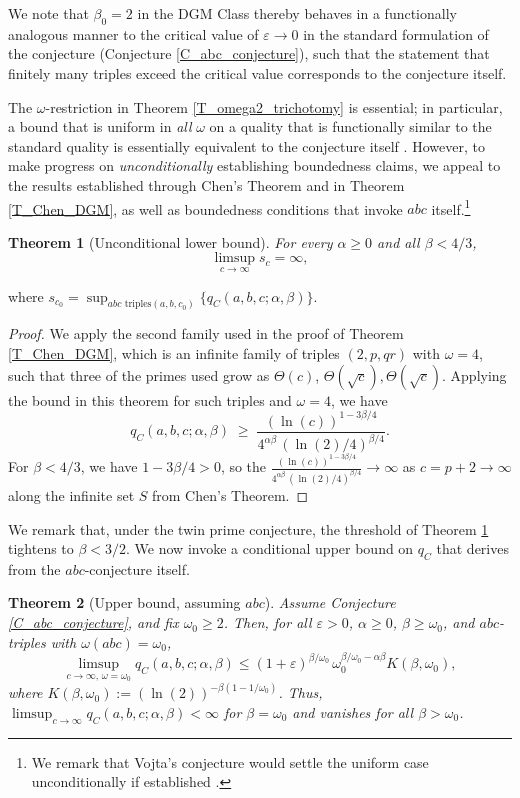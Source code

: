 \documentclass[11pt,letterpaper]{amsart}
\newtheorem{theorem}{Theorem}[section]
\newcommand{\eps}{\varepsilon}
\def\ra{\rightarrow}
\def\eps{\varepsilon}
\begin{document}
We note that $\beta_0=2$ in the DGM Class thereby behaves in a functionally analogous manner to the critical value of $\eps \ra 0$ in the standard formulation of the conjecture (Conjecture \ref{C_abc_conjecture}), such that the statement that finitely many triples exceed the critical value corresponds to the conjecture itself.

The $\omega$-restriction in Theorem \ref{T_omega2_trichotomy} is essential; in particular, a bound that is uniform in \textit{all} $\omega$ on a quality that is functionally similar to the standard quality is essentially equivalent to the conjecture itself \cite{waldschmidt2015,granville2002}. However, to make progress on \textit{unconditionally} establishing boundedness claims, we appeal to the results established through Chen's Theorem and in Theorem \ref{T_Chen_DGM}, as well as boundedness conditions that invoke $abc$ itself.\footnote{We remark that Vojta's conjecture would settle the uniform case unconditionally if established \cite{vojta1987}.}
\begin{theorem}[Unconditional lower bound]\label{T_uncond_LB}
For every $\alpha\ge 0$ and all $\beta<4/3$,
\[
\limsup_{c\to\infty} s_c = \infty,
\]
\end{theorem}
where $s_{c_0}=\sup_{\text{$abc$ triples} (a,b,c_0)}\{q_C(a,b,c;\alpha,\beta)\}$.

\begin{proof}
We apply the second family used in the proof of Theorem \ref{T_Chen_DGM}, which is an infinite family of triples $(2, p, qr)$ with $\omega = 4$, such that three of the primes used grow as $\Theta(c)$, $\Theta(\sqrt{c}),\Theta(\sqrt{c})$. Applying the bound in this theorem for such triples and $\omega = 4$, we have
\[
q_C(a, b, c;\alpha,\beta) \;\ge\; \frac{(\ln (c))^{1-3\beta/4}}{4^{\alpha\beta}\,(\ln (2)/4)^{\beta/4}}.
\]
For $\beta<4/3$, we have $1-3\beta/4>0$, so the $\frac{(\ln (c))^{1-3\beta/4}}{4^{\alpha\beta}\,(\ln (2)/4)^{\beta/4}} \ra \infty$ as $c=p+2\to\infty$ along the infinite set $S$ from Chen's Theorem.
\end{proof}

We remark that, under the twin prime conjecture, the threshold of Theorem \ref{T_uncond_LB} tightens to $\beta < 3/2$. We now invoke a conditional upper bound on $q_C$ that derives from the $abc$-conjecture itself.

\begin{theorem}[Upper bound, assuming $abc$]\label{T_cond_UB}
Assume Conjecture \ref{C_abc_conjecture}, and fix $\omega_0\ge 2$. Then, for all $\varepsilon>0$, $\alpha\ge 0$, $\beta\ge\omega_0$, and $abc$-triples with $\omega(abc)=\omega_0$,
\[
\limsup_{c\to\infty,\,\omega=\omega_0} q_C(a,b,c;\alpha,\beta)
 \le (1+\varepsilon)^{\beta/\omega_0}\,\omega_0^{\beta/\omega_0-\alpha\beta} K(\beta, \omega_0),
\]
where $K(\beta, \omega_0) := (\ln (2))^{-\beta(1-1/\omega_0)}$. Thus, $\limsup_{c \ra \infty} q_C(a, b, c; \alpha, \beta)  < \infty$ for $\beta = \omega_0$ and vanishes for all $\beta>\omega_0$.
\end{theorem}
\end{document}

